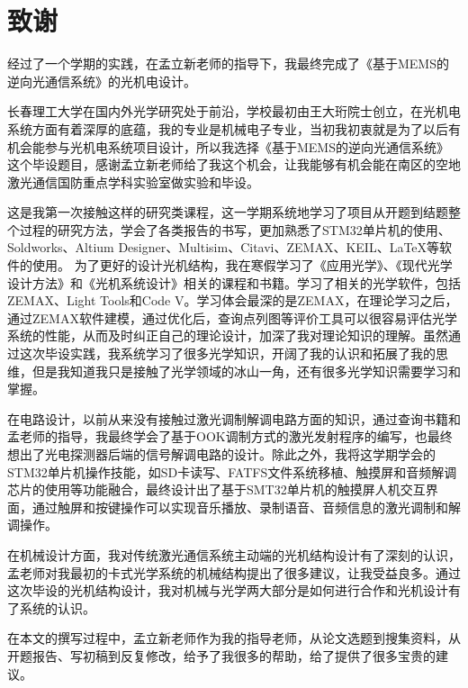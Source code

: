 \chapter[致谢]{致\quad 谢}%
\thispagestyle{noheaderstyle}%
\pagestyle{noheaderstyle}%

经过了一个学期的实践，在孟立新老师的指导下，我最终完成了《基于MEMS的逆向光通信系统》的光机电设计。
    
长春理工大学在国内外光学研究处于前沿，学校最初由王大珩院士创立，在光机电系统方面有着深厚的底蕴，我的专业是机械电子专业，当初我初衷就是为了以后有机会能参与光机电系统项目设计，所以我选择《基于MEMS的逆向光通信系统》这个毕设题目，感谢孟立新老师给了我这个机会，让我能够有机会能在南区的空地激光通信国防重点学科实验室做实验和毕设。

这是我第一次接触这样的研究类课程，这一学期系统地学习了项目从开题到结题整个过程的研究方法，学会了各类报告的书写，更加熟悉了STM32单片机的使用、Soldworks、Altium Designer、Multisim、Citavi、ZEMAX、KEIL、LaTeX等软件的使用。
为了更好的设计光机结构，我在寒假学习了《应用光学》、《现代光学设计方法》和《光机系统设计》相关的课程和书籍。学习了相关的光学软件，包括ZEMAX、Light Tools和Code V。学习体会最深的是ZEMAX，在理论学习之后，通过ZEMAX软件建模，通过优化后，查询点列图等评价工具可以很容易评估光学系统的性能，从而及时纠正自己的理论设计，加深了我对理论知识的理解。虽然通过这次毕设实践，我系统学习了很多光学知识，开阔了我的认识和拓展了我的思维，但是我知道我只是接触了光学领域的冰山一角，还有很多光学知识需要学习和掌握。

在电路设计，以前从来没有接触过激光调制解调电路方面的知识，通过查询书籍和孟老师的指导，我最终学会了基于OOK调制方式的激光发射程序的编写，也最终想出了光电探测器后端的信号解调电路的设计。除此之外，我将这学期学会的STM32单片机操作技能，如SD卡读写、FATFS文件系统移植、触摸屏和音频解调芯片的使用等功能融合，最终设计出了基于SMT32单片机的触摸屏人机交互界面，通过触屏和按键操作可以实现音乐播放、录制语音、音频信息的激光调制和解调操作。

在机械设计方面，我对传统激光通信系统主动端的光机结构设计有了深刻的认识，孟老师对我最初的卡式光学系统的机械结构提出了很多建议，让我受益良多。通过这次毕设的光机结构设计，我对机械与光学两大部分是如何进行合作和光机设计有了系统的认识。

在本文的撰写过程中，孟立新老师作为我的指导老师，从论文选题到搜集资料，从开题报告、写初稿到反复修改，给予了我很多的帮助，给了提供了很多宝贵的建议。

